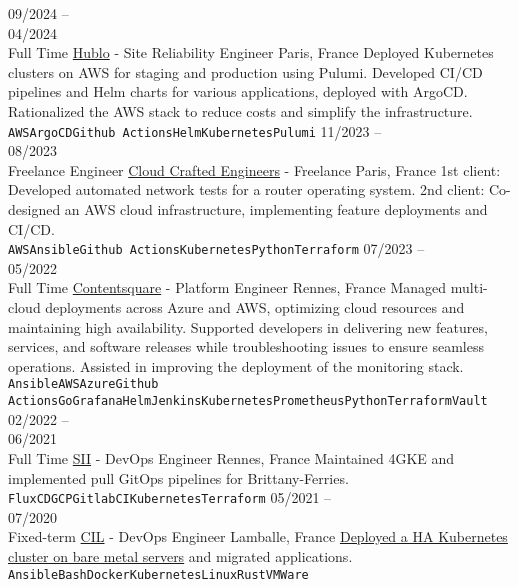 \documentclass[10pt]{developercv}
\begin{document}
\begin{entrylist}
	\entry
		{09/2024 --\\04/2024\\\footnotesize{Full Time}}
		{\href{https://www.hublo.com/}{Hublo} - Site Reliability Engineer}
		{Paris, France}
		{Deployed Kubernetes clusters on AWS for staging and production using Pulumi.
		Developed CI/CD pipelines and Helm charts for various applications, deployed with ArgoCD.
		Rationalized the AWS stack to reduce costs and simplify the infrastructure.\\
		\texttt{AWS}\slashsep\texttt{ArgoCD}\slashsep\texttt{Github Actions}\slashsep\texttt{Helm}\slashsep\texttt{Kubernetes}\slashsep\texttt{Pulumi}}
	\entry
		{11/2023 --\\08/2023\\\footnotesize{Freelance Engineer}}
		{\href{https://craftedengineers.cloud/}{Cloud Crafted Engineers} - Freelance}
		{Paris, France}
		{1st client: Developed automated network tests for a router operating system.
		2nd client: Co-designed an AWS cloud infrastructure, implementing feature deployments and CI/CD.\\
		\texttt{AWS}\slashsep\texttt{Ansible}\slashsep\texttt{Github Actions}\slashsep\texttt{Kubernetes}\slashsep\texttt{Python}\slashsep\texttt{Terraform}}
	\entry
		{07/2023 --\\05/2022\\\footnotesize{Full Time}}
		{\href{https://contentsquare.com/}{Contentsquare} - Platform Engineer}
		{Rennes, France}
		{Managed multi-cloud deployments across Azure and AWS, optimizing cloud resources and maintaining high availability.
		Supported developers in delivering new features, services, and software releases while troubleshooting issues to ensure seamless operations.
		Assisted in improving the deployment of the monitoring stack.\\
		\texttt{Ansible}\slashsep\texttt{AWS}\slashsep\texttt{Azure}\slashsep\texttt{Github Actions}\slashsep\texttt{Go}\slashsep\texttt{Grafana}\slashsep\texttt{Helm}\slashsep\texttt{Jenkins}\slashsep\texttt{Kubernetes}\slashsep\texttt{Prometheus}\slashsep\texttt{Python}\slashsep\texttt{Terraform}\slashsep\texttt{Vault}}
	\entry
		{02/2022 --\\06/2021\\\footnotesize{Full Time}}
		{\href{https://sii-group.com/}{SII} - DevOps Engineer}
		{Rennes, France}
		{Maintained 4GKE and implemented pull GitOps pipelines for Brittany-Ferries.\\
		\texttt{FluxCD}\slashsep\texttt{GCP}\slashsep\texttt{GitlabCI}\slashsep\texttt{Kubernetes}\slashsep\texttt{Terraform}}
	\entry
		{05/2021 --\\07/2020\\\footnotesize{Fixed-term}}
		{\href{https://www.cil-lamballe.com/}{CIL} - DevOps Engineer}
		{Lamballe, France}
		{\href{https://github.com/Ant0wan/VMWare-Kubenetes-cluster}{Deployed a HA Kubernetes cluster on bare metal servers} and migrated applications.\\
		\texttt{Ansible}\slashsep\texttt{Bash}\slashsep\texttt{Docker}\slashsep\texttt{Kubernetes}\slashsep\texttt{Linux}\slashsep\texttt{Rust}\slashsep\texttt{VMWare}}
\end{entrylist}
\end{document}

